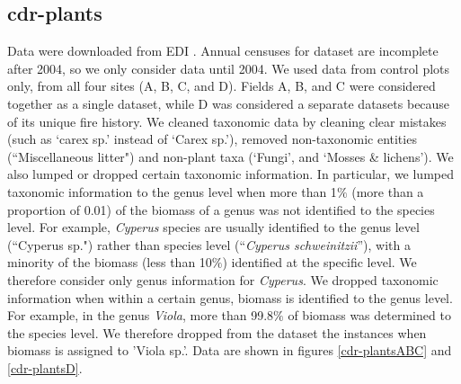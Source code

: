 \documentclass[11pt, oneside]{article}
\begin{document}
\subsection {cdr-plants}
Data were downloaded from EDI \citep{cdr-plants}.
Annual censuses for dataset are incomplete after 2004, so we only consider data until 2004. 
We used data from control plots only, from all four sites (A, B, C, and D). 
Fields A, B, and C were considered together as a single dataset, while D was considered a separate datasets because of its unique fire history.
We cleaned taxonomic data by cleaning clear mistakes (such as `carex sp.' instead of `Carex sp.'), removed non-taxonomic entities (``Miscellaneous litter") and non-plant taxa (`Fungi', and `Mosses \& lichens').
We also lumped or dropped certain taxonomic information. 
In particular, we lumped taxonomic information to the genus level when more than 1$\%$ (more than a proportion of 0.01) of the biomass of a genus was not identified to the species level. 
For example, {\it Cyperus} species are usually identified to the genus level (``Cyperus  sp.") rather than species level (``{\it Cyperus schweinitzii}''), with a minority of the biomass (less than 10$\%$) identified at the specific level. We therefore consider only genus information for {\it Cyperus}. 
We dropped taxonomic information when within a certain genus, biomass is identified to the genus level. 
For example, in the genus {\it Viola}, more than 99.8$\%$ of biomass was determined to the species level. We therefore dropped from the dataset the instances when biomass is assigned to 'Viola sp.'.
Data are shown in figures \ref{cdr-plantsABC} and \ref{cdr-plantsD}.
\end{document}
